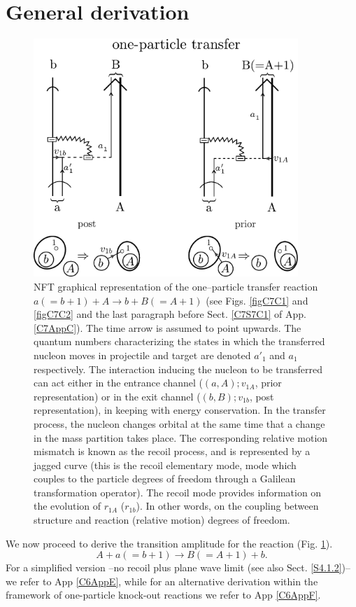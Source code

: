 \section{General derivation}\label{C4S1}
\begin{figure}
\centerline{\includegraphics*[width=10cm,angle=0]{C6/figs_C6/Reaction3}}
\caption{NFT graphical representation of the one--particle transfer reaction $a(=b+1)+A\rightarrow b+B(=A+1)$ (see Figs. \ref{figC7C1} and \ref{figC7C2} and  the last paragraph before Sect. \ref{C7S7C1} of App. \ref{C7AppC}). The time arrow is assumed to point upwards. The quantum numbers characterizing the states in which the transferred nucleon moves in projectile and target are denoted $a'_1$ and $a_1$ respectively. The interaction inducing the nucleon to be transferred can act either in the entrance channel ($(a,A);v_{1A}$, prior representation) or in the exit channel ($(b,B);v_{1b}$, post representation), in keeping with energy conservation. In the transfer process, the nucleon changes orbital at the same time that a change in the mass partition takes place. The corresponding relative motion mismatch is known as the recoil process, and is represented by a jagged curve (this is the recoil elementary mode, mode which couples to the particle degrees of freedom through a Galilean transformation operator). The recoil mode  provides information on the evolution of $r_{1A}$ ($r_{1b}$). In other words, on the coupling between structure and reaction (relative motion) degrees of freedom.}\label{fig6.1.1}
\end{figure}
We now proceed to derive the transition amplitude for the reaction (Fig. \ref{fig6.1.1}). 
\begin{equation}\label{eq_onept1}
    A+a(=b+1)\longrightarrow B(=A+1)+b.
\end{equation}
For a simplified version --no recoil plus plane wave limit (see also Sect. \ref{S4.1.2})-- we refer to App \ref{C6AppE}, while for an alternative derivation within the framework of one-particle knock-out reactions we refer to App \ref{C6AppF}.


